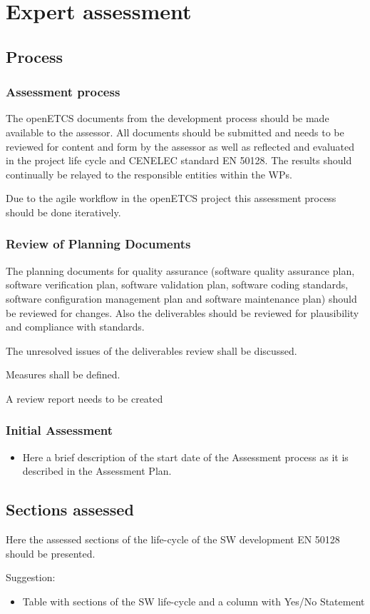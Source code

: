 \section{Expert assessment}
\subsection{Process }
\subsubsection{Assessment process}

\bigskip

{\textbullet} The openETCS documents from the development process should be made available to the assessor. All
documents should be submitted and needs to be reviewed for content and form by the assessor as well as reflected and
evaluated in the project life cycle and CENELEC standard EN 50128. The results should continually be relayed to the
responsible entities within the WPs.

{\textbullet} Due to the agile workflow in the openETCS project this assessment process should be done iteratively.


\bigskip

\subsubsection{Review of Planning Documents}
{\textbullet} The planning documents for quality assurance (software quality assurance plan, software verification plan,
software validation plan, software coding standards, software configuration management plan and software maintenance
plan) should be reviewed for changes. Also the deliverables should be reviewed for plausibility and compliance with
standards.

{\textbullet} The unresolved issues of the deliverables review shall be discussed.

{\textbullet} Measures shall be defined.

{\textbullet} A review report needs to be created


\bigskip


\bigskip

\subsubsection{Initial Assessment }
\begin{itemize}
\item Here a brief description of the start date of the Assessment process as it is described in the Assessment Plan. 
\end{itemize}
\subsection{Sections assessed}
{\textbullet} Here the assessed sections of the life-cycle of the SW development EN 50128 should be presented.

{\textbullet} Suggestion:

\begin{itemize}
\item Table with sections of the SW life-cycle and a column with Yes/No Statement 
\end{itemize}